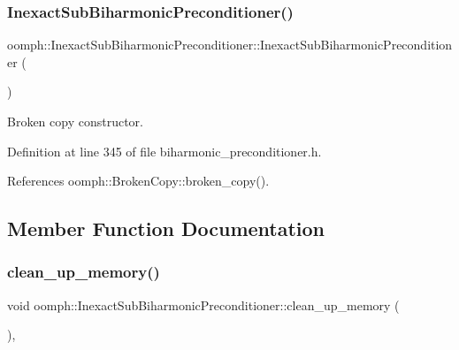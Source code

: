 \subsubsection{\texorpdfstring{Inexact\+Sub\+Biharmonic\+Preconditioner()}{InexactSubBiharmonicPreconditioner()}\hspace{0.1cm}{\footnotesize\ttfamily [2/2]}}
{\footnotesize\ttfamily oomph\+::\+Inexact\+Sub\+Biharmonic\+Preconditioner\+::\+Inexact\+Sub\+Biharmonic\+Preconditioner (\begin{DoxyParamCaption}\item[{const \hyperlink{classoomph_1_1InexactSubBiharmonicPreconditioner}{Inexact\+Sub\+Biharmonic\+Preconditioner} \&}]{ }\end{DoxyParamCaption})\hspace{0.3cm}{\ttfamily [inline]}}



Broken copy constructor. 



Definition at line 345 of file biharmonic\+\_\+preconditioner.\+h.



References oomph\+::\+Broken\+Copy\+::broken\+\_\+copy().



\subsection{Member Function Documentation}
\mbox{\label{classoomph_1_1InexactSubBiharmonicPreconditioner_a5a8e4b8f01a5192066f1ac095845f308}} 
\subsubsection{\texorpdfstring{clean\+\_\+up\+\_\+memory()}{clean\_up\_memory()}}
{\footnotesize\ttfamily void oomph\+::\+Inexact\+Sub\+Biharmonic\+Preconditioner\+::clean\+\_\+up\+\_\+memory (\begin{DoxyParamCaption}{ }\end{DoxyParamCaption})\hspace{0.3cm}{\ttfamily [inline]}, {\ttfamily [virtual]}}



